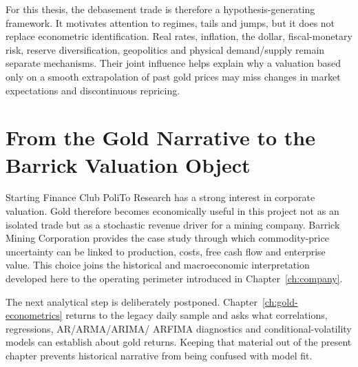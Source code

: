 For this thesis, the debasement trade is therefore a hypothesis-generating
framework. It motivates attention to regimes, tails and jumps, but it does not
replace econometric identification. Real rates, inflation, the dollar,
fiscal-monetary risk, reserve diversification, geopolitics and physical
demand/supply remain separate mechanisms. Their joint influence helps explain
why a valuation based only on a smooth extrapolation of past gold prices may
miss changes in market expectations and discontinuous repricing.

\section{From the Gold Narrative to the Barrick Valuation Object}

Starting Finance Club PoliTo Research has a strong interest in corporate valuation. Gold
therefore becomes economically useful in this project not as an isolated trade
but as a stochastic revenue driver for a mining company. Barrick Mining
Corporation provides the case study through which commodity-price uncertainty
can be linked to production, costs, free cash flow and enterprise value. This
choice joins the historical and macroeconomic interpretation developed here to
the operating perimeter introduced in Chapter~\ref{ch:company}.

The next analytical step is deliberately postponed. Chapter~\ref{ch:gold-econometrics} returns to the
legacy daily sample and asks what correlations, regressions, AR/ARMA/ARIMA/
ARFIMA diagnostics and conditional-volatility models can establish about gold
returns. Keeping that material out of the present chapter prevents historical
narrative from being confused with model fit.
